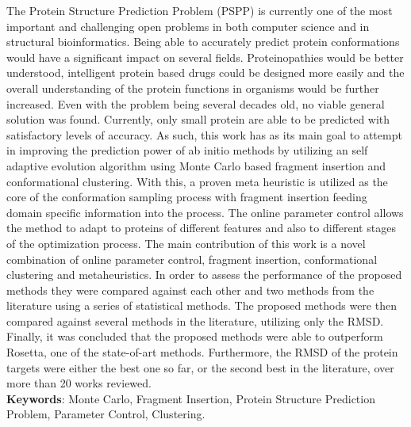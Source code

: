 \begin{resumo}
  The Protein Structure Prediction Problem (PSPP) is currently one of the
  most important and challenging open problems in both computer science and
  in structural bioinformatics. Being able to accurately predict protein
  conformations would have a significant impact on several fields.
  Proteinopathies would be better understood, intelligent protein based drugs
  could be designed more easily and the overall understanding of the protein
  functions in organisms would be further increased. Even with the problem being
  several decades old, no viable general solution was found. Currently, only
  small protein are able to be predicted with satisfactory levels of
  accuracy. As such, this work has as its main goal to attempt in improving the
  prediction power of ab initio methods by utilizing an self adaptive
  evolution algorithm using Monte Carlo based fragment insertion and
  conformational clustering. With this, a proven meta heuristic is utilized
  as the core of the conformation sampling process with fragment insertion
  feeding domain specific information into the process. The online parameter
  control allows the method to adapt to proteins of different features
  and also to different stages of the optimization process. The main
  contribution of this work is a novel combination of online parameter
  control, fragment insertion, conformational clustering and metaheuristics.
  In order to assess the performance of the proposed methods they were
  compared against each other and two methods from the literature using
  a series of statistical methods. The proposed methods were then compared
  against several methods in the literature, utilizing only the RMSD. 
  Finally, it was
  concluded that the proposed methods were able to outperform Rosetta, one of
  the state-of-art methods. Furthermore, the RMSD of the protein targets were
  either the best one so far, or the second best in the literature, over more
  than 20 works reviewed.
  \\
  \vspace{\onelineskip}
  \noindent
  \textbf{Keywords}: Monte Carlo, Fragment Insertion, Protein Structure Prediction Problem, Parameter Control, Clustering.
\end{resumo}



